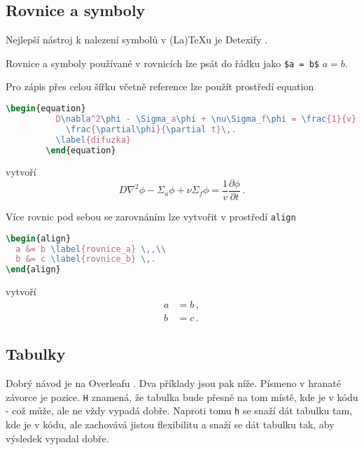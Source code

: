 \documentclass{cygclanek}
\begin{document}
\subsection{Rovnice a symboly}
    Nejlepší nástroj k nalezení symbolů v (La)\TeX u je Detexify \cite{detexify}.

Rovnice a symboly používané v rovnicích lze psát do řádku jako \verb|$a = b$| $a = b$. 

Pro zápis přes celou šířku včetně reference lze použít prostředí equation
    \begin{lstlisting}[language=TeX]
        \begin{equation}
          D\nabla^2\phi - \Sigma_a\phi + \nu\Sigma_f\phi = \frac{1}{v}
            \frac{\partial\phi}{\partial t}\,.
          \label{difuzka}
        \end{equation}
    \end{lstlisting}
    vytvoří 
\begin{equation}
  D\nabla^2\phi - \Sigma_a\phi + \nu\Sigma_f\phi = \frac{1}{v}\frac{\partial
  \phi}{\partial t}\,.
  \label{difuzka}
\end{equation}

Více rovnic pod sebou se zarovnáním lze vytvořit v prostředí \verb|align|
\begin{lstlisting}[language=TeX]
\begin{align}
  a &= b \label{rovnice_a} \,,\\
  b &= c \label{rovnice_b} \,.
\end{align}
\end{lstlisting}
vytvoří
\begin{align}
  a &= b \label{rovnice_a} \,,\\
  b &= c \label{rovnice_b} \,.
\end{align}


\subsection{Tabulky}

Dobrý návod je na Overleafu \cite{overleaf_tables}. Dva příklady jsou pak níže. Písmeno v hranaté závorce 
je pozice. \verb|H| znamená, že tabulka bude přesně na tom místě, kde je v kódu - což může, ale ne vždy 
vypadá dobře. Naproti tomu \verb|h| se snaží dát tabulku tam, kde je v kódu, ale zachovává jistou flexibilitu 
a snaží se dát tabulku tak, aby výsledek vypadal dobře.
\end{document}
